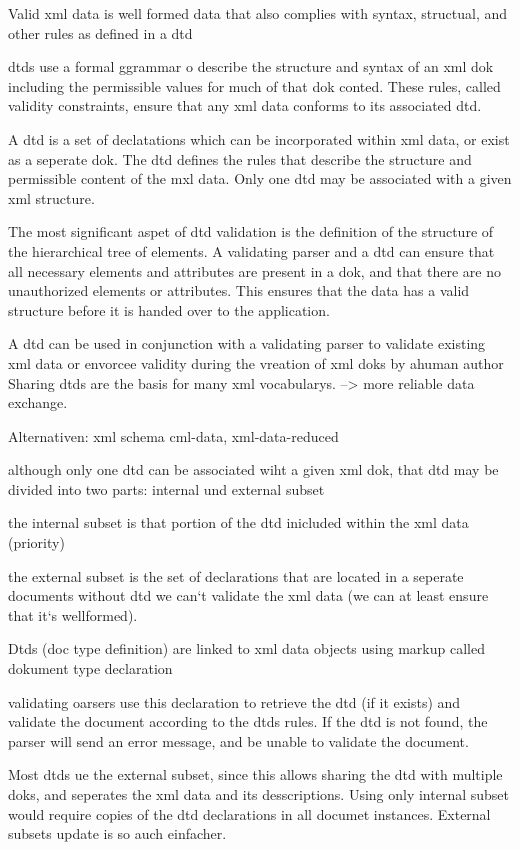 Valid xml data is well formed data that also complies with syntax, structual, and other rules as defined in a dtd

dtds use a formal ggrammar o describe the structure and syntax of an xml dok including the permissible values for much of that dok conted. These rules, called validity constraints, ensure that any xml data conforms to its associated dtd.

A dtd is a set of declatations which can be incorporated within xml data, or exist as a seperate dok. The dtd defines the rules that describe the structure and permissible content of the mxl data. Only one dtd may be associated with a given xml structure.

The most significant aspet of dtd validation is the definition of the structure of the hierarchical tree of elements. A validating parser and a dtd can ensure that all necessary elements and attributes are present in a dok, and that there are no unauthorized elements or attributes. This ensures that the data has a valid structure before it is handed over to the application.

A dtd can be used in conjunction with a validating parser to validate existing xml data or envorcee validity during the vreation of xml doks by ahuman author Sharing dtds are the basis for many xml vocabularys. --> more reliable data exchange.

Alternativen: xml schema cml-data, xml-data-reduced

although only one dtd can be associated wiht a given xml dok, that dtd may be divided into two parts: internal und external subset

the internal subset is that portion of the dtd inicluded within the xml data (priority)

the external subset is the set of declarations that are located in a seperate documents without dtd we can‘t validate the xml data (we can at least ensure that it‘s wellformed).

Dtds (doc type definition) are linked to xml data objects using markup called dokument type declaration

validating oarsers use this declaration to retrieve the dtd (if it exists) and validate the document according to the dtds rules. If the dtd is not found, the parser will send an error message, and be unable to validate the document.

Most dtds ue the external subset, since this allows sharing the dtd with multiple doks, and seperates the xml data and its desscriptions. Using only internal subset would require copies of the dtd declarations in all documet instances. External subsets update is so auch einfacher.

